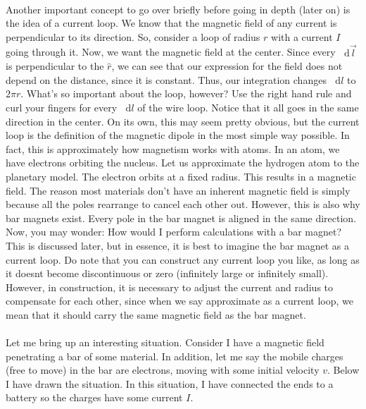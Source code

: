 \documentclass{article}
\newcommand*\dif{\mathop{}\!\mathrm{d}}
\begin{document}
\\
Another important concept to go over briefly before going in depth (later on) is the idea of a current loop. We know that the magnetic field of any current is perpendicular to its direction. So, consider a loop of radius $r$ with a current $I$ going through it. Now, we want the magnetic field at the center. Since every $\dif \vec{l}$ is perpendicular to the $\hat{r}$, we can see that our expression for the field does not depend on the distance, since it is constant. Thus, our integration changes $\dif l$ to $2\pi r$. What's so important about the loop, however? Use the right hand rule and curl your fingers for every $\dif l$ of the wire loop. Notice that it all goes in the same direction in the center. On its own, this may seem pretty obvious, but the current loop is the definition of the magnetic dipole in the most simple way possible. In fact, this is approximately how magnetism works with atoms. In an atom, we have electrons orbiting the nucleus. Let us approximate the hydrogen atom to the planetary model. The electron orbits at a fixed radius. This results in a magnetic field. The reason most materials don't have an inherent magnetic field is simply because all the poles rearrange to cancel each other out. However, this is also why bar magnets exist. Every pole in the bar magnet is aligned in the same direction. Now, you may wonder: How would I perform calculations with a bar magnet? This is discussed later, but in essence, it is best to imagine the bar magnet as a current loop. Do note that you can construct any current loop you like, as long as it doesnt become discontinuous or zero (infinitely large or infinitely small). However, in construction, it is necessary to adjust the current and radius to compensate for each other, since when we say approximate as a current loop, we mean that it should carry the same magnetic field as the bar magnet.\\
\\
Let me bring up an interesting situation. Consider I have a magnetic field penetrating a bar of some material. In addition, let me say the mobile charges (free to move) in the bar are electrons, moving with some initial velocity $v$. Below I have drawn the situation. In this situation, I have connected the ends to a battery so the charges have some current $I$. 
\end{document}
